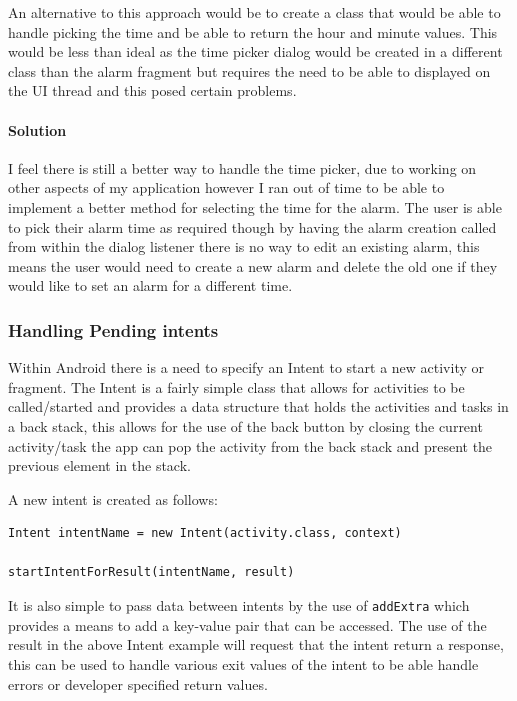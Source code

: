 An alternative to this approach would be to create a class that would be
able to handle picking the time and be able to return the hour and
minute values. This would be less than ideal as the time picker dialog
would be created in a different class than the alarm fragment but
requires the need to be able to displayed on the UI thread and this
posed certain problems.

\paragraph{Solution}\label{solution-1}

I feel there is still a better way to handle the time picker, due to
working on other aspects of my application however I ran out of time to
be able to implement a better method for selecting the time for the
alarm. The user is able to pick their alarm time as required though by
having the alarm creation called from within the dialog listener there
is no way to edit an existing alarm, this means the user would need to
create a new alarm and delete the old one if they would like to set an
alarm for a different time.

\subsubsection{Handling Pending intents}\label{handling-pending-intents}

Within Android there is a need to specify an Intent to start a new
activity or fragment. The Intent is a fairly simple class that allows
for activities to be called/started and provides a data structure that
holds the activities and tasks in a back stack, this allows for the use
of the back button by closing the current activity/task the app can pop
the activity from the back stack and present the previous element in the
stack.

A new intent is created as follows:

\begin{lstlisting}
Intent intentName = new Intent(activity.class, context)

startIntentForResult(intentName, result)
\end{lstlisting}

It is also simple to pass data between intents by the use of
\lstinline!addExtra! which provides a means to add a key-value pair that
can be accessed. The use of the result in the above Intent example will
request that the intent return a response, this can be used to handle
various exit values of the intent to be able handle errors or developer
specified return values.

